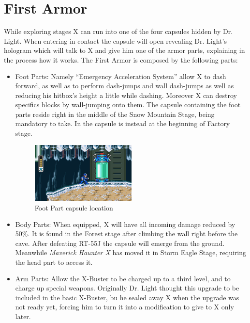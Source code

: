 \section{First Armor}\label{X1:Armor}
While exploring stages X can run into one of the four capsules hidden by Dr. Light. When entering in contact the capsule will open revealing Dr. Light's hologram which will talk to X and give him one of the armor parts\cite{wiki:First_armor}, explaining in the process how it works.
The First Armor is composed by the following parts:
\begin{itemize}
	\item Foot Parts: Namely ``Emergency Acceleration System''\cite{X:Manual} allow X to dash forward, as well as to perform dash-jumps and wall dash-jumps as well as reducing his hitbox's height a little while dashing. Moreover X can destroy specifics blocks by wall-jumping onto them. The capsule containing the foot parts reside right in the middle of the Snow Mountain Stage, being mandatory to take. In \mhx the capsule is instead at the beginning of Factory stage.
	\begin{figure}[h]
		\centering
		\includegraphics[width=0.5\textwidth]{figures/X1/Armor_foot.jpg}
		\caption{Foot Part capsule location}
	\end{figure}
	
	\item Body Parts: When equipped, X will have all incoming damage reduced by 50\%. It is found in the Forest stage after climbing the wall right before the cave. After defeating RT-55J the capsule will emerge from the ground. Meanwhile \textit{Maverick Haunter X} has moved it in Storm Eagle Stage, requiring the head part to access it.
	
	\item Arm Parts: Allow the X-Buster to be charged up to a third level, and to charge up special weapons. Originally Dr. Light thought this upgrade to be included in the basic X-Buster\cite{X:Manual}, bu he sealed away X when the upgrade was not ready yet, forcing him to turn it into a modification to give to X only later.
	

\end{itemize}
